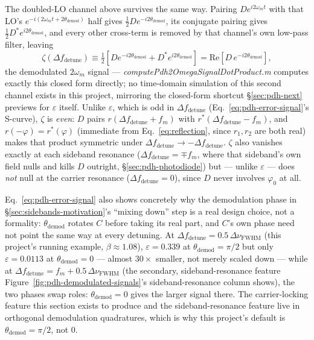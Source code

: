 \documentclass[9pt]{article}
\begin{document}
The doubled-LO channel above survives the same way.
Pairing $De^{i2\omega_m t}$ with that LO's $e^{-i(2\omega_m t+2\theta_{\mathrm{demod}})}$
half gives $\tfrac12 De^{-i2\theta_{\mathrm{demod}}}$, its conjugate pairing
gives $\tfrac12D^*e^{i2\theta_{\mathrm{demod}}}$, and every other
cross-term is removed by that channel's own low-pass filter, leaving
\begin{equation}
\zeta\!\left(\Delta f_{\mathrm{detune}}\right) \equiv \tfrac12\left[De^{-i2\theta_{\mathrm{demod}}} + D^*e^{i2\theta_{\mathrm{demod}}}\right] = \mathrm{Re}\!\left[D\,e^{-i2\theta_{\mathrm{demod}}}\right],
\label{eq:pdh-zeta}
\end{equation}
the demodulated $2\omega_m$ signal --- \textit{computePdh2OmegaSignalDotProduct.m}
computes exactly this closed form directly; no time-domain simulation of
this second channel exists in this project, mirroring the closed-form
shortcut \S\ref{sec:pdh-next} previews for $\varepsilon$ itself. Unlike
$\varepsilon$, which is odd in $\Delta f_{\mathrm{detune}}$
(Eq.~\eqref{eq:pdh-error-signal}'s S-curve), $\zeta$ is \emph{even}: $D$
pairs $r(\Delta f_{\mathrm{detune}}+f_m)$ with
$r^*(\Delta f_{\mathrm{detune}}-f_m)$, and
$r(-\varphi)=r^*(\varphi)$ (immediate from Eq.~\eqref{eq:reflection},
since $r_1,r_2$ are both real) makes that product symmetric under
$\Delta f_{\mathrm{detune}}\to-\Delta f_{\mathrm{detune}}$. $\zeta$ also
vanishes exactly at each sideband resonance
($\Delta f_{\mathrm{detune}}=\mp f_m$, where that sideband's own field
nulls and kills $D$ outright, \S\ref{sec:pdh-photodiode}) but --- unlike
$\varepsilon$ --- does \emph{not} null at the carrier resonance
($\Delta f_{\mathrm{detune}}=0$), since $D$ never involves $\varphi_0$ at
all.

Eq.~\eqref{eq:pdh-error-signal} also shows concretely why the demodulation
phase in \S\ref{sec:sidebands-motivation}'s ``mixing down'' step is a real
design choice, not a formality: $\theta_{\mathrm{demod}}$ rotates $C$
before taking its real part, and $C$'s own phase need not point the same
way at every detuning. At
$\Delta f_{\mathrm{detune}}=0.5\,\Delta\nu_{\mathrm{FWHM}}$ (this project's
running example, $\beta\approx1.08$), $\varepsilon=0.339$ at
$\theta_{\mathrm{demod}}=\pi/2$ but only $\varepsilon=0.0113$ at
$\theta_{\mathrm{demod}}=0$ --- almost $30\times$ smaller, not merely
scaled down --- while at
$\Delta f_{\mathrm{detune}}=f_m+0.5\,\Delta\nu_{\mathrm{FWHM}}$ (the
secondary, sideband-resonance feature Figure~\ref{fig:pdh-demodulated-signals}'s
sideband-resonance column shows), the two phases swap roles: $\theta_{\mathrm{demod}}=0$
gives the larger signal there. The carrier-locking feature this section
exists to produce and the sideband-resonance feature live in orthogonal
demodulation quadratures, which is why this project's default is
$\theta_{\mathrm{demod}}=\pi/2$, not $0$.
\end{document}
